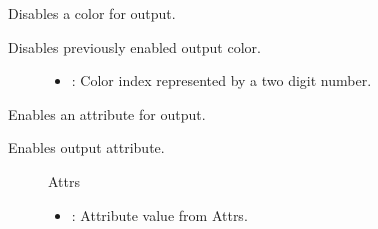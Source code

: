 \documentclass[letterpaper,10pt,english]{sphinxmanual}
\begin{document}
\begin{fulllineitems}
\begin{fulllineitems}
\begin{description}
\begin{itemize}
\end{itemize}

\end{description}


\end{fulllineitems}


\begin{fulllineitems}
\label{\detokenize{index:_CPPv2N7ostendo6Window8ColorOffEi}}%
\pysigstartmultiline
{}\label{\detokenize{index:Pessumclassostendo_1_1Window_1a903272ec03cce94e8505dcd9f3317375}}%
\pysigstopmultiline
Disables a color for output. 

Disables previously enabled output color. \begin{description}
\item[{}] \leavevmode\begin{itemize}
\item {} 
: Color index represented by a two digit number. 

\end{itemize}

\end{description}


\end{fulllineitems}


\begin{fulllineitems}
\label{\detokenize{index:_CPPv2N7ostendo6Window6AttrOnEi}}%
\pysigstartmultiline
{}\label{\detokenize{index:Pessumclassostendo_1_1Window_1ab91a9f66a8f05e9349905ec9b1623de4}}%
\pysigstopmultiline
Enables an attribute for output. 

Enables output attribute. \begin{description}
\item[{}] \leavevmode
Attrs 

\item[{}] \leavevmode\begin{itemize}
\item {} 
: Attribute value from Attrs. 

\end{itemize}


\end{description}
\end{fulllineitems}
\end{fulllineitems}
\end{document}
